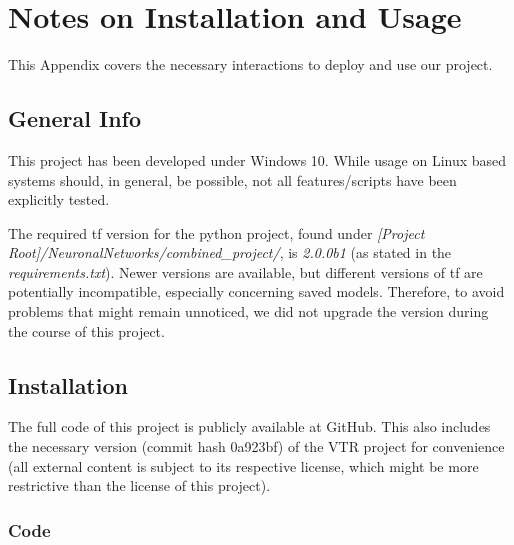 

\chapter{Notes on Installation and Usage}\label{ch:InstallAndUse}
\glsresetall %

This Appendix covers the necessary interactions to deploy and use our project.

\section{General Info}

This project has been developed under Windows 10. While usage on Linux based systems should, in general, be possible, not all features/scripts have been explicitly tested.

The required \gls{tf} version for the python project, found under \textit{[Project Root]/NeuronalNetworks/combined\_project/}, is \textit{2.0.0b1} (as stated in the \textit{requirements.txt}). Newer versions are available, but different versions of \gls{tf} are potentially incompatible, especially concerning saved models. Therefore, to avoid problems that might remain unnoticed, we did not upgrade the version during the course of this project. 

\section{Installation}

The full code of this project is publicly available at GitHub\cite{this-project}. This also includes the necessary version (commit hash 0a923bf) of the \gls{VTR} project for convenience (all external content is subject to its respective license, which might be more restrictive than the license of this project).

\subsection{Code}

